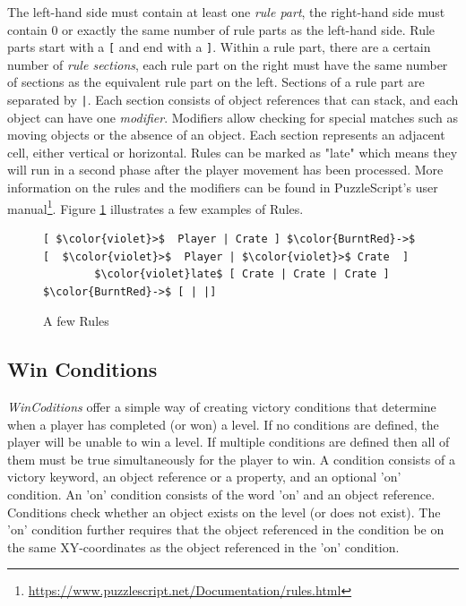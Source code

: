 The left-hand side must contain at least one \emph{rule part}, the right-hand side must contain 0 or exactly the same number of rule parts as the left-hand side.  Rule parts start with a \texttt{[} and end with a \texttt{]}. Within a rule part, there are a certain number of \emph{rule sections}, each rule part on the right must have the same number of sections as the equivalent rule part on the left. Sections of a rule part are separated by \texttt{|}. Each section consists of object references that can stack, and each object can have one \emph{modifier}. Modifiers allow checking for special matches such as moving objects or the absence of an object. Each section represents an adjacent cell, either vertical or horizontal. Rules can be marked as "late" which means they will run in a second phase after the player movement has been processed. More information on the rules and the modifiers can be found in PuzzleScript's user manual\footnote{\url{https://www.puzzlescript.net/Documentation/rules.html}}. Figure \ref{fig:rule_code} illustrates a few examples of Rules.

\begin{figure}
    \centering
    \begin{lstlisting}[language=PuzzleScript]
        [ $\color{violet}>$  Player | Crate ] $\color{BurntRed}->$ [  $\color{violet}>$  Player | $\color{violet}>$ Crate  ]
        $\color{violet}late$ [ Crate | Crate | Crate ] $\color{BurntRed}->$ [ | |]
    \end{lstlisting}
    \caption{A few Rules}
    \label{fig:rule_code}
\end{figure}

\subsection{Win Conditions}
\emph{WinCoditions} offer a simple way of creating victory conditions that determine when a player has completed  (or won) a level. If no conditions are defined, the player will be unable to win a level. If multiple conditions are defined then all of them must be true simultaneously for the player to win. A condition consists of a victory keyword, an object reference or a property, and an optional 'on' condition. An 'on' condition consists of the word 'on' and an object reference. Conditions check whether an object exists on the level (or does not exist). The 'on' condition further requires that the object referenced in the condition be on the same XY-coordinates as the object referenced in the 'on' condition.

